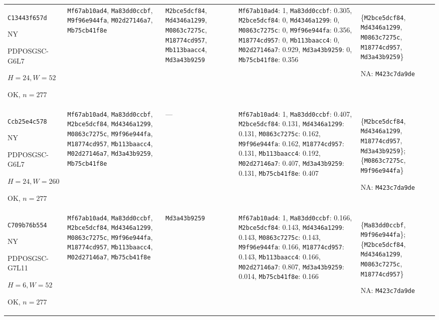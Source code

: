 \begin{longtable}{p{.15\linewidth}p{.17\linewidth}p{.17\linewidth}p{.25\linewidth}p{.14\linewidth}}
\texttt{C13443f657d}\par NY\par PDPOSGSC-\allowbreak{}G6L7\par $H=24,W=52$\par OK, $n=277$ & \texttt{Mf67ab10ad4}, \texttt{Ma83dd0ccbf}, \texttt{M9f96e944fa}, \texttt{M02d27146a7}, \texttt{Mb75cb41f8e} & \texttt{M2bce5dcf84}, \texttt{Md4346a1299}, \texttt{M0863c7275c}, \texttt{M18774cd957}, \texttt{Mb113baacc4}, \texttt{Md3a43b9259} & \texttt{Mf67ab10ad4}: 1, \texttt{Ma83dd0ccbf}: 0.305, \texttt{M2bce5dcf84}: 0, \texttt{Md4346a1299}: 0, \texttt{M0863c7275c}: 0, \texttt{M9f96e944fa}: 0.356, \texttt{M18774cd957}: 0, \texttt{Mb113baacc4}: 0, \texttt{M02d27146a7}: 0.929, \texttt{Md3a43b9259}: 0, \texttt{Mb75cb41f8e}: 0.356 & \{\texttt{M2bce5dcf84}, \texttt{Md4346a1299}, \texttt{M0863c7275c}, \texttt{M18774cd957}, \texttt{Md3a43b9259}\}\par NA: \texttt{M423c7da9de} \\
\texttt{Ccb25e4c578}\par NY\par PDPOSGSC-\allowbreak{}G6L7\par $H=24,W=260$\par OK, $n=277$ & \texttt{Mf67ab10ad4}, \texttt{Ma83dd0ccbf}, \texttt{M2bce5dcf84}, \texttt{Md4346a1299}, \texttt{M0863c7275c}, \texttt{M9f96e944fa}, \texttt{M18774cd957}, \texttt{Mb113baacc4}, \texttt{M02d27146a7}, \texttt{Md3a43b9259}, \texttt{Mb75cb41f8e} & --- & \texttt{Mf67ab10ad4}: 1, \texttt{Ma83dd0ccbf}: 0.407, \texttt{M2bce5dcf84}: 0.131, \texttt{Md4346a1299}: 0.131, \texttt{M0863c7275c}: 0.162, \texttt{M9f96e944fa}: 0.162, \texttt{M18774cd957}: 0.131, \texttt{Mb113baacc4}: 0.192, \texttt{M02d27146a7}: 0.407, \texttt{Md3a43b9259}: 0.131, \texttt{Mb75cb41f8e}: 0.407 & \{\texttt{M2bce5dcf84}, \texttt{Md4346a1299}, \texttt{M18774cd957}, \texttt{Md3a43b9259}\}; \{\texttt{M0863c7275c}, \texttt{M9f96e944fa}\}\par NA: \texttt{M423c7da9de} \\
\texttt{C709b76b554}\par NY\par PDPOSGSC-\allowbreak{}G7L11\par $H=6,W=52$\par OK, $n=277$ & \texttt{Mf67ab10ad4}, \texttt{Ma83dd0ccbf}, \texttt{M2bce5dcf84}, \texttt{Md4346a1299}, \texttt{M0863c7275c}, \texttt{M9f96e944fa}, \texttt{M18774cd957}, \texttt{Mb113baacc4}, \texttt{M02d27146a7}, \texttt{Mb75cb41f8e} & \texttt{Md3a43b9259} & \texttt{Mf67ab10ad4}: 1, \texttt{Ma83dd0ccbf}: 0.166, \texttt{M2bce5dcf84}: 0.143, \texttt{Md4346a1299}: 0.143, \texttt{M0863c7275c}: 0.143, \texttt{M9f96e944fa}: 0.166, \texttt{M18774cd957}: 0.143, \texttt{Mb113baacc4}: 0.166, \texttt{M02d27146a7}: 0.807, \texttt{Md3a43b9259}: 0.014, \texttt{Mb75cb41f8e}: 0.166 & \{\texttt{Ma83dd0ccbf}, \texttt{M9f96e944fa}\}; \{\texttt{M2bce5dcf84}, \texttt{Md4346a1299}, \texttt{M0863c7275c}, \texttt{M18774cd957}\}\par NA: \texttt{M423c7da9de} \\

\end{longtable}
